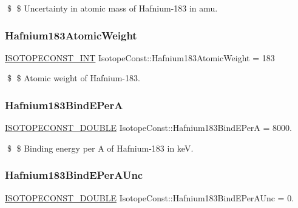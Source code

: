 \$ \$ Uncertainty in atomic mass of Hafnium-\/183 in amu. \mbox{\label{group___isotope_const-_hafnium-_hf183_gaa4c6c24cf2503d7237d85395d166800b}} 
\subsubsection{\texorpdfstring{Hafnium183\+Atomic\+Weight}{Hafnium183AtomicWeight}}
{\footnotesize\ttfamily \mbox{\hyperlink{group___isotope_const-_macros_ga5f18360b3e99483a35c32d789e62621c}{I\+S\+O\+T\+O\+P\+E\+C\+O\+N\+S\+T\+\_\+\+I\+NT}} Isotope\+Const\+::\+Hafnium183\+Atomic\+Weight = 183}

\$ \$ Atomic weight of Hafnium-\/183. \mbox{\label{group___isotope_const-_hafnium-_hf183_ga8ce579826e9519f533134e6b02a2548d}} 
\subsubsection{\texorpdfstring{Hafnium183\+Bind\+E\+PerA}{Hafnium183BindEPerA}}
{\footnotesize\ttfamily \mbox{\hyperlink{group___isotope_const-_macros_ga8f45a7272ce02c0b4c65c44636ed719a}{I\+S\+O\+T\+O\+P\+E\+C\+O\+N\+S\+T\+\_\+\+D\+O\+U\+B\+LE}} Isotope\+Const\+::\+Hafnium183\+Bind\+E\+PerA = 8000.}

\$ \$ Binding energy per A of Hafnium-\/183 in keV. \mbox{\label{group___isotope_const-_hafnium-_hf183_ga7d87490b56843a87b885524c1f50de05}} 
\subsubsection{\texorpdfstring{Hafnium183\+Bind\+E\+Per\+A\+Unc}{Hafnium183BindEPerAUnc}}
{\footnotesize\ttfamily \mbox{\hyperlink{group___isotope_const-_macros_ga8f45a7272ce02c0b4c65c44636ed719a}{I\+S\+O\+T\+O\+P\+E\+C\+O\+N\+S\+T\+\_\+\+D\+O\+U\+B\+LE}} Isotope\+Const\+::\+Hafnium183\+Bind\+E\+Per\+A\+Unc = 0.}

